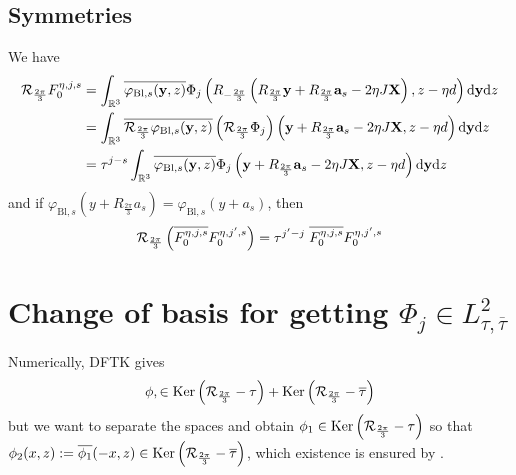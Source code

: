 \documentclass[11pt,a4paper,reqno,french,tikz]{amsart}
\def\d{{\rm d}}
\newcommand{\pa}[1]{\left( #1 \right)} %
\newcommand\vp{\varphi} %
\let\p\relax\newcommand{\p}{\psi} %
\newcommand{\f}[2]{\frac{#1}{#2}} %
\def\bX{{\mathbf X}}
\def\ba{{\mathbf a}}
\def\by{{\mathbf y}}
\begin{document}
\subsection{Symmetries}%
\label{sub:symmetries}

We have
\begin{align*}
	\cR_{\f{2\pi}{3}} F_0^{\eta,j,s} &= \int_{\R^3} \overline{\vp_{\text{Bl},s}(\by,z)} \Phi_j \pa{R_{-\f{2\pi}3} \pa{R_{\f{2\pi}{3}}\by + R_{\f{2\pi}{3}} \ba_s -2\eta J \bX},z-\eta d} \d \by \d z \\
 &= \int_{\R^3} \overline{\cR_{\f{2\pi}{3}}\vp_{\text{Bl},s}(\by,z)} \pa{\cR_{\f{2\pi}{3}} \Phi_j} \pa{\by + R_{\f{2\pi}{3}} \ba_s -2\eta J \bX,z-\eta d} \d \by \d z \\
	&= \tau^{j-s} \int_{\R^3} \overline{ \vp_{\text{Bl},s}(\by,z)} \Phi_j \pa{\by + R_{\f{2\pi}{3}} \ba_s -2\eta J \bX,z-\eta d} \d \by \d z \\
\end{align*}
and if $\vp_{\text{Bl},s}(y + R_{\f{2\pi}{3}} a_s) = \vp_{\text{Bl},s}(y + a_s)$, then 
\begin{align*}
\cR_{\f{2\pi}{3}} \pa{ \overline{F_0^{\eta,j,s}} F_0^{\eta,j',s}} = \tau^{j'-j} \; \overline{F_0^{\eta,j,s}} F_0^{\eta,j',s}
\end{align*}



\section{Change of basis for getting $\Phi_j \in L^2_{\tau,\overline{\tau}}$}%
\label{sub:change_of_basis_for_getting_l_2__tau_tau}
Numerically, DFTK gives 
\begin{align*}
\phi, \p \in \Ker \pa{\cR_{\f{2\pi}{3}}-\tau} + \Ker\pa{\cR_{\f{2\pi}{3}}-\overline{\tau}}
\end{align*}
but we want to separate the spaces and obtain $\phi_1 \in \Ker \pa{\cR_{\f{2\pi}{3}}-\tau}$ so that $\phi_2(x,z) := \overline{\phi_1}(-x,z) \in \Ker\pa{\cR_{\f{2\pi}{3}}-\overline{\tau}}$, which existence is ensured by \cite{FefWei12}.
\end{document}
